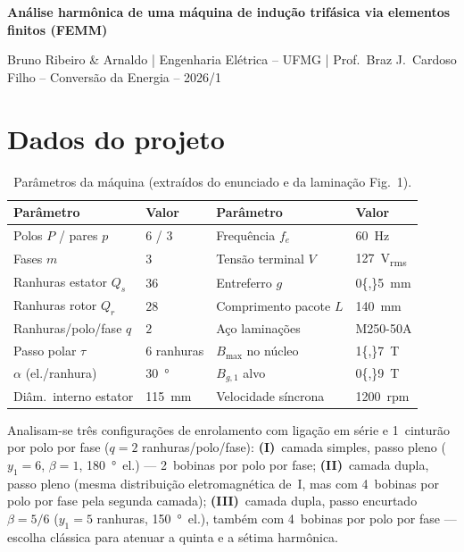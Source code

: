 \documentclass[12pt,a4paper]{article}
\begin{document}
\fontsize{12}{15}\selectfont

{\centering\bfseries
Análise harmônica de uma máquina de indução trifásica
via elementos finitos (FEMM)\\[2pt]}
{\centering\small
Bruno Ribeiro \& Arnaldo \;|\;
Engenharia Elétrica -- UFMG \;|\;
Prof.\ Braz J.\ Cardoso Filho -- Conversão da Energia -- 2026/1\par}
\vspace{3pt}

\section{Dados do projeto}

\begin{table}[h!]
\vspace{-2pt}\centering\small
\caption{Parâmetros da máquina (extraídos do enunciado e da laminação Fig.~1).}
\label{tab:dados}
\setlength{\tabcolsep}{5pt}
\begin{tabular}{llll}
\toprule
\textbf{Parâmetro} & \textbf{Valor} & \textbf{Parâmetro} & \textbf{Valor}\\
\midrule
Polos $P$ / pares $p$   & $6$ / $3$    & Frequência $f_e$       & \SI{60}{Hz}\\
Fases $m$               & $3$          & Tensão terminal $V$    & \SI{127}{V_{rms}}\\
Ranhuras estator $Q_s$  & $36$         & Entreferro $g$         & \SI{0{,}5}{mm}\\
Ranhuras rotor $Q_r$    & $28$         & Comprimento pacote $L$ & \SI{140}{mm}\\
Ranhuras/polo/fase $q$  & $2$          & Aço laminações         & M250-50A\\
Passo polar $\tau$      & $6$ ranhuras & $B_{\max}$ no núcleo   & \SI{1{,}7}{T}\\
$\alpha$ (el./ranhura)  & \SI{30}{\degree} & $B_{g,1}$ alvo     & \SI{0{,}9}{T}\\
Diâm.\ interno estator  & \SI{115}{mm} & Velocidade síncrona    & \SI{1200}{rpm}\\
\bottomrule
\end{tabular}
\end{table}
\vspace{-2pt}

Analisam-se três configurações de enrolamento com ligação em série e
1~cinturão por polo por fase ($q{=}2$ ranhuras/polo/fase):
\textbf{(I)}~camada simples, passo pleno ($y_1{=}6$, $\beta{=}1$,
\SI{180}{\degree}~el.) --- 2~bobinas por polo por fase;
\textbf{(II)}~camada dupla, passo pleno (mesma distribuição eletromagnética
de~I, mas com 4~bobinas por polo por fase pela segunda camada);
\textbf{(III)}~camada dupla, passo encurtado $\beta{=}5/6$
($y_1{=}5$ ranhuras, \SI{150}{\degree}~el.), também com 4~bobinas por polo
por fase --- escolha clássica para atenuar a quinta e a sétima harmônica.
\end{document}
